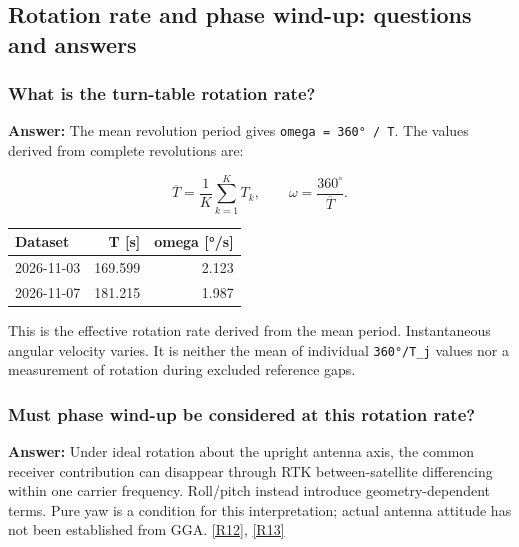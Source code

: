 \documentclass[11pt,a4paper]{article}
\numberwithin{equation}{section}
\numberwithin{figure}{section}
\begin{document}
\subsection{Rotation rate and phase wind-up: questions and answers}

\subsubsection{What is the turn-table rotation rate?}

\textbf{Answer:} The mean revolution period gives {\small\texttt{omega = 360° /\allowbreak{} T}}. The values derived from complete revolutions are:

\begin{equation}\overline T=\frac{1}{K}\sum_{k=1}^{K}T_k,\qquad \omega=\frac{360^{\circ}}{\overline T}.\label{eq:en-rotation}\end{equation}

\begin{center}\begin{lrbox}{\reporttable}\small\setlength{\tabcolsep}{4pt}\begin{tabular}{lrr}\toprule
Dataset & T [s] & omega [°/\allowbreak{}s]\\\midrule
2026-11-03 & 169.599 & 2.123\\
2026-11-07 & 181.215 & 1.987\\
\bottomrule\end{tabular}\end{lrbox}\ifdim\wd\reporttable>\linewidth\resizebox{\linewidth}{!}{\usebox{\reporttable}}\else\usebox{\reporttable}\fi\end{center}

This is the effective rotation rate derived from the mean period. Instantaneous angular velocity varies. It is neither the mean of individual {\small\texttt{360°/\allowbreak{}T\_\allowbreak{}j}} values nor a measurement of rotation during excluded reference gaps.

\subsubsection{Must phase wind-up be considered at this rotation rate?}

\textbf{Answer:} Under ideal rotation about the upright antenna axis, the common receiver contribution can disappear through RTK between-satellite differencing within one carrier frequency. Roll/\allowbreak{}pitch instead introduce geometry-dependent terms. Pure yaw is a condition for this interpretation; actual antenna attitude has not been established from GGA. \hyperlink{ref-R12}{[R12]}, \hyperlink{ref-R13}{[R13]}
\end{document}
